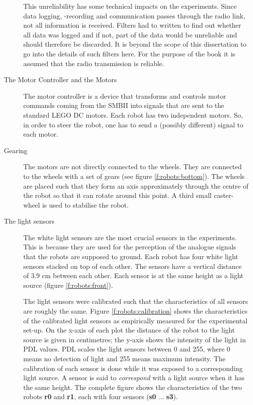 \begin{description}
This unreliability has some technical impacts on the experiments. Since data logging, -recording and communication passes through the radio link, not all information is received. Filters had to written to find out whether all data was logged and if not, part of the data would be unreliable and should therefore be discarded. It is beyond the scope of this dissertation to go into the details of such filters here. For the purpose  of the book it is assumed that the radio transmission is reliable.

\item[The Motor Controller and the Motors] The motor controller is a device that transforms and controls motor commands coming from the SMBII into signals that are sent to the standard LEGO DC motors. Each robot has two independent motors. So, in order to steer the robot, one has to send a (possibly different) signal to each motor.

\item[Gearing] The motors are not directly connected to the wheels. They are connected to the wheels with a set of gears (see figure \ref{f:robots:bottom}). The wheels are placed such that they form an axis approximately through the centre of the robot so that it can rotate around this point. A third small caster-wheel is used to stabilise the robot. 

\item[The light sensors] The white light sensors are the most crucial sensors in the experiments. This is because they are used for the perception of the analogue signals that the robots are supposed to ground. Each robot has four white light sensors stacked on top of each other. The sensors have a vertical distance of 3.9 cm between each other. Each sensor is at the same height as a light source (figure \ref{f:robots:front}). 

The light sensors were calibrated such that the characteristics of all sensors are roughly the same. Figure \ref{f:robots:calibration} shows the characteristics of the calibrated light sensors as empirically measured for the experimental set-up. On the x-axis of each plot the distance of the robot to the light source is given in centimetres; the y-axis shows the intensity of the light in PDL values. PDL scales the light sensors between 0 and 255, where 0 means no detection of light and 255 means maximum intensity. The calibration of each sensor is done while it was exposed to a corresponding light source. A sensor is said to {\em correspond} with a light source when it has the same height. The complete figure shows the characteristics of the two robots {\bf r0} and {\bf r1}, each with four sensors ({\bf s0} $\ldots$ {\bf s3}).


\end{description}

